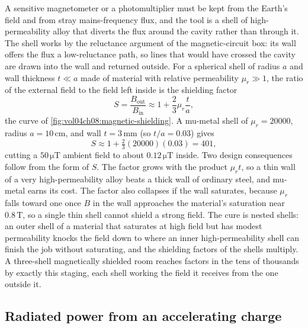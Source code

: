 A sensitive magnetometer or a photomultiplier must be kept from the Earth's
field and from stray mains-frequency flux, and the tool is a shell of
high-permeability alloy that diverts the flux around the cavity rather than
through it. The shell works by the reluctance argument of the
magnetic-circuit box: its wall offers the flux a low-reluctance path, so
lines that would have crossed the cavity are drawn into the wall and
returned outside. For a spherical shell of radius $a$ and wall thickness
$t \ll a$ made of material with relative permeability $\mu_r \gg 1$, the
ratio of the external field to the field left inside is the shielding factor
\[
S = \frac{B_{\text{out}}}{B_{\text{in}}} \approx 1 + \frac{2}{3}\mu_r
\frac{t}{a},
\]
the curve of \cref{fig:vol04ch08:magnetic-shielding}. A mu-metal shell of
$\mu_r = 20000$, radius $a = 10\,\si{\centi\meter}$, and wall $t = 3\,\si{
\milli\meter}$ (so $t/a = 0.03$) gives
\[
S \approx 1 + \tfrac{2}{3}(20000)(0.03) = 401,
\]
cutting a $50\,\si{\micro\tesla}$ ambient field to about $0.12\,\si{\micro
\tesla}$ inside. Two design consequences follow from the form of $S$. The
factor grows with the product $\mu_r t$, so a thin wall of a very
high-permeability alloy beats a thick wall of ordinary steel, and mu-metal
earns its cost. The factor also collapses if the wall saturates, because
$\mu_r$ falls toward one once $B$ in the wall approaches the material's
saturation near $0.8\,\si{\tesla}$, so a single thin shell cannot shield a
strong field. The cure is nested shells: an outer shell of a material that
saturates at high field but has modest permeability knocks the field down
to where an inner high-permeability shell can finish the job without
saturating, and the shielding factors of the shells multiply. A three-shell
magnetically shielded room reaches factors in the tens of thousands by
exactly this staging, each shell working the field it receives from the one
outside it.



\subsection{Radiated power from an accelerating charge}

